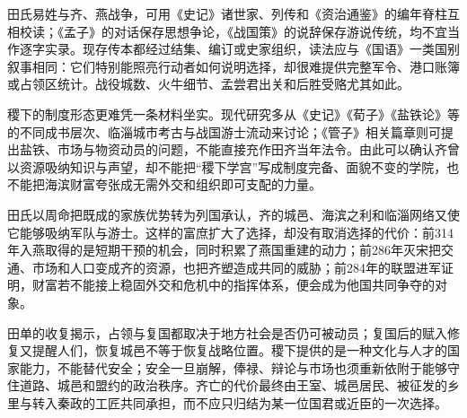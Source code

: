 \begin{sourcenote}[材料的范围]
田氏易姓与齐、燕战争，可用《史记》诸世家、列传和《资治通鉴》的编年脊柱互相校读；《孟子》的对话保存思想争论，《战国策》的说辞保存游说传统，均不宜当作逐字实录。现存传本都经过结集、编订或史家组织，读法应与《国语》一类国别叙事相同：它们特别能照亮行动者如何说明选择，却很难提供完整军令、港口账簿或占领区统计。战役城数、火牛细节、孟尝君出关和后胜受赂尤其如此。

稷下的制度形态更难凭一条材料坐实。现代研究多从《史记》《荀子》《盐铁论》等的不同成书层次、临淄城市考古与战国游士流动来讨论；《管子》相关篇章则可提出盐铁、市场与物资动员的问题，不能直接充作田齐当年法令。由此可以确认齐曾以资源吸纳知识与声望，却不能把“稷下学宫”写成制度完备、面貌不变的学院，也不能把海滨财富夸张成无需外交和组织即可支配的力量。
\end{sourcenote}

\begin{turningpoint}
田氏以周命把既成的家族优势转为列国承认，齐的城邑、海滨之利和临淄网络又使它能够吸纳军队与游士。这样的富庶扩大了选择，却没有取消选择的代价：前314年入燕取得的是短期干预的机会，同时积累了燕国重建的动力；前286年灭宋把交通、市场和人口变成齐的资源，也把齐塑造成共同的威胁；前284年的联盟进军证明，财富若不能接上稳固外交和危机中的指挥体系，便会成为他国共同争夺的对象。

田单的收复揭示，占领与复国都取决于地方社会是否仍可被动员；复国后的赋入修复又提醒人们，恢复城邑不等于恢复战略位置。稷下提供的是一种文化与人才的国家能力，不能替代安全；安全一旦崩解，俸禄、辩论与市场也须重新依附于能够守住道路、城邑和盟约的政治秩序。齐亡的代价最终由王室、城邑居民、被征发的乡里与转入秦政的工匠共同承担，而不应只归结为某一位国君或近臣的一次选择。
\end{turningpoint}
